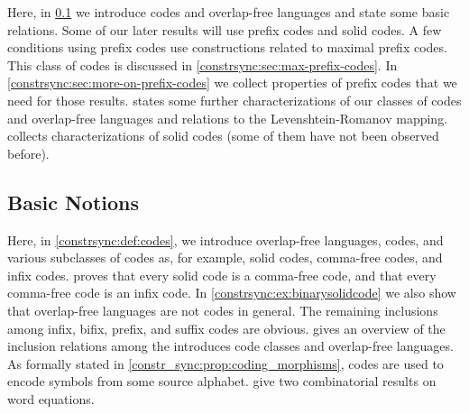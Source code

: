 
Here, in \cref{constrsync:sec:codes:basic-notions} we introduce codes and overlap-free languages
and state some basic relations. Some of our later results will use prefix codes and solid codes. 
A few conditions using prefix codes use constructions related to maximal prefix codes. This
class of codes is discussed in \cref{constrsync:sec:max-prefix-codes}.
In \cref{constrsync:sec:more-on-prefix-codes} we collect properties of prefix codes that we need for those results.
 states some further characterizations of our classes of codes and overlap-free languages and relations to the Levenshtein-Romanov mapping.
 collects characterizations of solid codes (some of them have
not been observed before).

\subsection{Basic Notions}
\label{constrsync:sec:codes:basic-notions}

Here, in \cref{constrsync:def:codes}, we introduce overlap-free languages,
codes, and various subclasses of codes as, for example, solid codes, comma-free codes, and infix codes.
proves that every solid code is a comma-free code, and that every comma-free code is an infix code.
In \cref{constrsync:ex:binarysolidcode} we also show that overlap-free languages
are not codes in general. The remaining inclusions among infix, bifix, prefix, and suffix codes
are obvious.  gives an overview of the inclusion relations among
the introduces code classes and overlap-free languages.
As formally stated in \cref{constr_sync:prop:coding_morphisms},
codes are used to encode symbols from some source alphabet.
give two combinatorial results on word equations.

